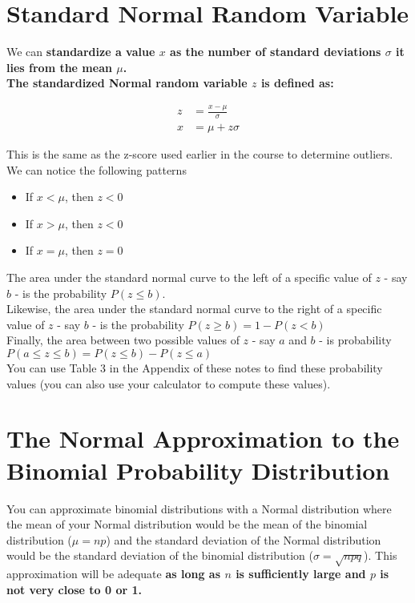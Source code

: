 \section{Standard Normal Random Variable}

We can \bf{standardize} a value $x$ as the number of standard deviations $\sigma$ it lies from the mean $\mu$. \\

The \bf{standardized Normal random variable} $z$ is defined as:

$$
    \begin{aligned}
        z &= \frac{x-\mu}{\sigma}\\
        x &= \mu + z\sigma
    \end{aligned}
$$

This is the same as the z-score used earlier in the course to determine outliers. We can notice the following patterns

\begin{itemize}
    \item If $x < \mu$, then $z < 0$
    \item If $x > \mu$, then $z < 0$
    \item If $x = \mu$, then $z=0$
\end{itemize}

The area under the standard normal curve to the left of a specific value of $z$ - say $b$ - is the probability $P(z \le b)$.\\

Likewise, the area under the standard normal curve to the right of a specific value of $z$ - say $b$ - is the probability $P(z \ge b) = 1 - P(z < b)$\\

Finally, the area between two possible values of $z$ - say $a$ and $b$ - is probability $P(a \le z \le b) = P(z \le b) - P(z \le a)$\\

You can use Table 3 in the Appendix of these notes to find these probability values (you can also use your calculator to compute these values).


\section{The Normal Approximation to the Binomial Probability Distribution}

You can approximate binomial distributions with a Normal distribution where the mean of your Normal distribution would be the mean of the binomial distribution ($\mu = np$) and the standard deviation of the Normal distribution would be the standard deviation of the binomial distribution ($\sigma = \sqrt{npq}$). This approximation will be adequate \bf{as long as $n$ is sufficiently large and $p$ is not very close to 0 or 1}.\\

